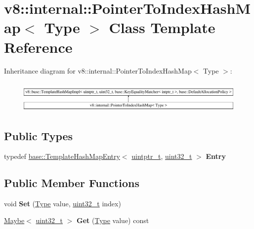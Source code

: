 \hypertarget{classv8_1_1internal_1_1PointerToIndexHashMap}{}\section{v8\+:\+:internal\+:\+:Pointer\+To\+Index\+Hash\+Map$<$ Type $>$ Class Template Reference}
\label{classv8_1_1internal_1_1PointerToIndexHashMap}
Inheritance diagram for v8\+:\+:internal\+:\+:Pointer\+To\+Index\+Hash\+Map$<$ Type $>$\+:\begin{figure}[H]
\begin{center}
\leavevmode
\includegraphics[height=1.575246cm]{classv8_1_1internal_1_1PointerToIndexHashMap}
\end{center}
\end{figure}
\subsection*{Public Types}
\begin{DoxyCompactItemize}
\item 
\mbox{\label{classv8_1_1internal_1_1PointerToIndexHashMap_a717358b5d7930c5ebe9cf5b8bc96a896}} 
typedef \mbox{\hyperlink{structv8_1_1base_1_1TemplateHashMapEntry}{base\+::\+Template\+Hash\+Map\+Entry}}$<$ \mbox{\hyperlink{classuintptr__t}{uintptr\+\_\+t}}, \mbox{\hyperlink{classuint32__t}{uint32\+\_\+t}} $>$ {\bfseries Entry}
\end{DoxyCompactItemize}
\subsection*{Public Member Functions}
\begin{DoxyCompactItemize}
\item 
\mbox{\label{classv8_1_1internal_1_1PointerToIndexHashMap_a370bd201d47721f8d4971116dfc62b01}} 
void {\bfseries Set} (\mbox{\hyperlink{classstatic_01const_01StackFrame_1_1Type}{Type}} value, \mbox{\hyperlink{classuint32__t}{uint32\+\_\+t}} index)
\item 
\mbox{\label{classv8_1_1internal_1_1PointerToIndexHashMap_a6b3ae1b5f56a135d2f04a66582a57840}} 
\mbox{\hyperlink{classv8_1_1Maybe}{Maybe}}$<$ \mbox{\hyperlink{classuint32__t}{uint32\+\_\+t}} $>$ {\bfseries Get} (\mbox{\hyperlink{classstatic_01const_01StackFrame_1_1Type}{Type}} value) const
\end{DoxyCompactItemize}
